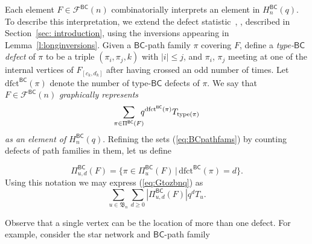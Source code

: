 \documentclass[12pt]{amsart}
\theoremstyle{definition}
\numberwithin{equation}{section}
\newcommand{\bn}{\mathfrak{B}_n}
\newcommand{\hbnq}{H_n^{\msfBC}(q)}
\newcommand{\dfct}{\mathrm{dfct}}
\newcommand{\dfctbc}{\mathrm{dfct}^{\msfBC}}
\newcommand{\type}{\mathrm{type}}
\newcommand{\nTksp}{\negthickspace\negthickspace}
\newcommand{\PiBC}{\Pi^{\msfBC}}
\newcommand{\net}[2]{\mathcal F^{\mathsf{#1}}(#2)}
\newcommand{\msfBC}{\mathsf{BC}}
\begin{document}
Each element $F \in \net{BC}n$ combinatorially interprets an element in $\hbnq$. To describe this interpretation, we extend the defect statistic~\cite{BWHex}, \cite{CSkanTNNChar}, \cite{Deodhar90} described in Section~\ref{sec: introduction}, using the inversions appearing in Lemma~\ref{l:longinversions}. Given a $\msfBC$-path family $\pi$ covering $F$, define a {\em type-$\msfBC$ defect} of $\pi$ to be
a triple $(\pi_i, \pi_j, k)$ with $|i| \leq j$, and $\pi_i$, $\pi_j$ meeting at one of the internal vertices of $F_{[c_k,d_k]}$ after having crossed an odd number of times. Let $\dfctbc(\pi)$ denote the number of type-$\msfBC$ defects of $\pi$.
We say that $F \in \net{\msfBC}n$ {\em graphically represents}
\begin{equation}\label{eq:Gtozbnq}
\sum_{\pi \in \PiBC(F)} \nTksp q^{\dfct^{\msfBC}(\pi)} T_{\type(\pi)}
\end{equation}
{\em as an element of $\hbnq$}. Refining the sets (\ref{eq:BCpathfams}) by counting defects of path families in them, let us define

\begin{equation}\label{eq:BCpathfams_type_defect}
\PiBC_{u,d}(F) = \{ \pi \in \PiBC_u(F) \,|\, \dfctbc(\pi) = d \}.
\end{equation}
Using this notation we may express (\ref{eq:Gtozbnq}) as
\begin{equation*}
    \sum_{u \in \bn} \sum_{d \geq 0} |\PiBC_{u,d}(F)| q^d T_u.
\end{equation*}

Observe that a single vertex can be the location of more than one defect. For example, consider the star network and $\msfBC$-path family
\end{document}
